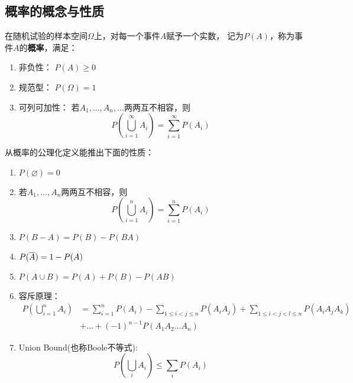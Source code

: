 \subsection{概率的概念与性质}
\begin{definition}[概率]
  在随机试验的样本空间$\Omega$上，对每一个事件$A$赋予一个实数，
  记为$P(A)$，称为事件$A$的\textbf{概率}，满足：
  \begin{enumerate}
    \item 非负性：
    $P(A)\ge 0$
    \item 规范型：
    $P(\Omega) = 1$
    \item 可列可加性：
    若$A_1,\dots,A_n,\dots$两两互不相容，则
    \begin{displaymath}
      P\left(\bigcup_{i=1}^\infty A_i\right)=\sum_{i=1}^\infty P(A_i)
    \end{displaymath}
  \end{enumerate}
\end{definition}

\begin{theorem}[概率的性质]
  从概率的公理化定义能推出下面的性质：
  \begin{enumerate}
    \item
    $P(\varnothing) = 0$
    \item
    若$A_1,\dots,A_n$两两互不相容，则
    \begin{displaymath}
    P\left(\bigcup_{i=1}^n A_i\right)=\sum_{i=1}^n P(A_i)
    \end{displaymath}
    \item 
    $P(B-A) = P(B) - P(BA)$
    \item
    $P(\overline{A}) = 1 - P(A)$
    \item 
    $P(A\cup B) = P(A) + P(B) - P(AB)$
    \item
    容斥原理：
    \begin{align*}
      P\left(\bigcup_{i=1}^n A_i\right) 
      &= \sum_{i=1}^n P(A_i) - \sum_{1\le i<j\le n} P(A_iA_j)
      + \sum_{1\le i<j<l\le n} P(A_iA_jA_k) \\
      &+ \dots + (-1)^{n-1}P(A_1A_2\dots A_n)
    \end{align*}
    \item 
    Union Bound(也称Boole不等式):
    \begin{displaymath}
      P\left(\bigcup_i A_i\right) \le \sum_i P(A_i)
    \end{displaymath}
  \end{enumerate}
\end{theorem}

